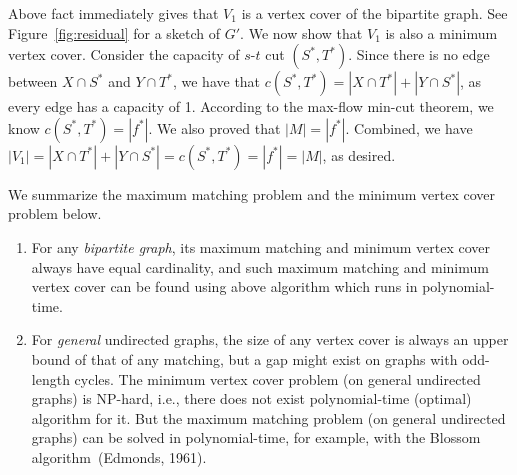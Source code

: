 Above fact immediately gives that $V_1$ is a vertex cover of the bipartite graph.
See Figure~\ref{fig:residual} for a sketch of $G'$.
We now show that $V_1$ is also a minimum vertex cover.
Consider the capacity of $s$-$t$ cut $(S^*, T^*)$. 
Since there is no edge between $X\cap S^*$ and $Y\cap T^*$, we have
that $c(S^*, T^*) = |X\cap T^*| + |Y\cap S^*|$, as every edge has a capacity of 1.
According to the max-flow min-cut theorem, we know 
$c(S^*, T^*) = |f^*|$. We also proved that $|M| = |f^*|$. Combined, 
we have $|V_1| = |X\cap T^*| + |Y\cap S^*| = c(S^*, T^*) = |f^*| = |M|$, as desired.

We summarize the maximum matching problem and the minimum vertex cover problem below.
\vspace*{-\topsep}
\begin{enumerate}
\item For any \emph{bipartite graph}, its maximum matching
and minimum vertex cover always have equal cardinality,
and such maximum matching and minimum vertex cover
can be found using above algorithm which runs in polynomial-time.
\item For \emph{general} undirected graphs, the size of
any vertex cover is always an upper bound of that of any matching,
but a gap might exist on graphs with odd-length cycles.
The minimum vertex cover problem (on general undirected graphs) is NP-hard, i.e., there does not
exist polynomial-time (optimal) algorithm for it.
But the maximum matching problem (on general undirected graphs) can be solved in polynomial-time,
for example, with the Blossom algorithm~(Edmonds, 1961).
\end{enumerate}

